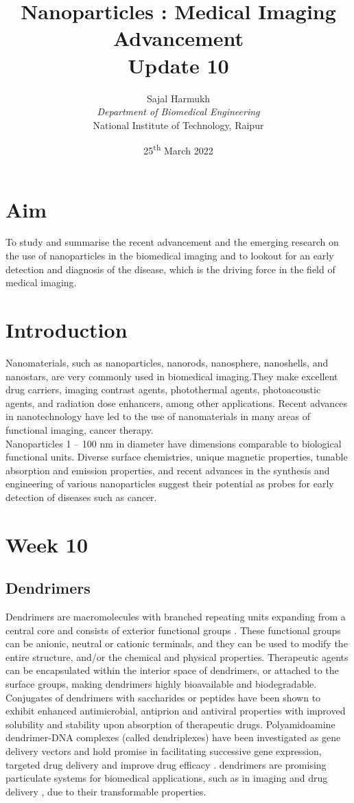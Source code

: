\documentclass{article}
\title{\textbf{Nanoparticles : Medical Imaging Advancement\\Update 10}}
\author{Sajal Harmukh \\ \textit{Department of Biomedical Engineering} \\ National Institute of Technology, Raipur }
\date{25\textsuperscript{th} March 2022}
\begin{document}
\maketitle

\section*{Aim}
\large
To study and summarise the recent advancement and the emerging research on the use of nanoparticles in the biomedical imaging and to lookout for an early detection and diagnosis of the disease, which is the driving force in the field of medical imaging.

\section*{Introduction}
Nanomaterials, such as nanoparticles, nanorods, nanosphere, nanoshells, and nanostars, are
very commonly used in biomedical imaging.They make excellent drug carriers, imaging contrast agents, photothermal agents, photoacoustic agents, and radiation dose enhancers, among other applications. Recent advances in nanotechnology have led to the use of nanomaterials
in many areas of functional imaging, cancer therapy.\\ Nanoparticles 1 – 100 nm in diameter have dimensions comparable to biological functional units. Diverse surface chemistries, unique magnetic properties, tunable absorption and emission properties, and recent advances in the synthesis and engineering of various nanoparticles suggest their potential as probes for early detection of diseases such as cancer.
 


\section*{Week 10 }
\subsection*{ Dendrimers }
Dendrimers are macromolecules with branched repeating units expanding from a central core and consists of exterior functional groups . These functional groups can be anionic, neutral or cationic terminals, and they can be used to modify the entire structure, and/or the chemical and physical properties. Therapeutic agents can be encapsulated within the interior space of dendrimers, or attached to the surface groups, making dendrimers highly bioavailable and biodegradable. Conjugates of dendrimers with saccharides or peptides have been shown to exhibit enhanced antimicrobial, antiprion and antiviral properties with improved solubility and stability upon absorption of therapeutic drugs. Polyamidoamine dendrimer-DNA complexes (called dendriplexes) have been investigated as gene delivery vectors and hold promise in facilitating successive gene expression, targeted drug delivery and improve drug efficacy . dendrimers are promising particulate systems for biomedical applications, such as in imaging and drug delivery , due to their transformable properties.

 
\end{document}
